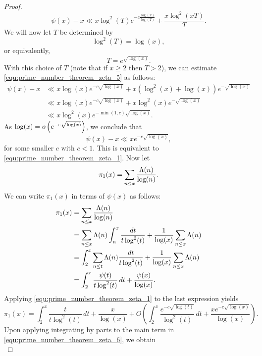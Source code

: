 \begin{proof}
      \begin{equation}\label{equ:prime_number_theorem_zeta_5}
        \psi(x)-x \ll x\log^{2}(T)e^{-c\frac{\log(x)}{\log(T)}}+\frac{x\log^{2}(xT)}{T}.
      \end{equation}
      We will now let $T$ be determined by
      \[
        \log^{2}(T) = \log(x),
      \]
      or equivalently,
      \[
        T = e^{\sqrt{\log(x)}}.
      \]
      With this choice of $T$ (note that if $x \ge 2$ then $T > 2$), we can estimate \cref{equ:prime_number_theorem_zeta_5} as follows:
      \begin{align*}
        \psi(x)-x &\ll x\log(x)e^{-c\sqrt{\log(x)}}+x\left(\log^{2}(x)+\log(x)\right)e^{-\sqrt{\log(x)}} \\
        &\ll x\log(x)e^{-c\sqrt{\log(x)}}+x\log^{2}(x)e^{-\sqrt{\log(x)}} \\
        &\ll x\log^{2}(x)e^{-\min(1,c)\sqrt{\log(x)}}.
      \end{align*}
      As $\log(x) = o\left(e^{-\varepsilon\sqrt{\log(x)}}\right)$, we conclude that
      \[
        \psi(x)-x \ll xe^{-c\sqrt{\log(x)}},
      \]
      for some smaller $c$ with $c < 1$. This is equivalent to \cref{equ:prime_number_theorem_zeta_1}. Now let
      \[
        \pi_{1}(x) = \sum_{n \le x}\frac{\Lambda(n)}{\log(n)}.
      \]
      We can write $\pi_{1}(x)$ in terms of $\psi(x)$ as follows:
      \begin{align*}
        \pi_{1}(x) &= \sum_{n \le x}\frac{\Lambda(n)}{\log(n)} \\
        &= \sum_{n \le x}\Lambda(n)\int_{n}^{x}\frac{dt}{t\log^{2}(t)}+\frac{1}{\log(x)}\sum_{n \le x}\Lambda(n) \\
        &= \int_{2}^{x}\sum_{n \le t}\Lambda(n)\frac{dt}{t\log^{2}(t)}+\frac{1}{\log(x)}\sum_{n \le x}\Lambda(n) \\
        &= \int_{2}^{x}\frac{\psi(t)}{t\log^{2}(t)}\,dt+\frac{\psi(x)}{\log(x)}.
      \end{align*}
      Applying \cref{equ:prime_number_theorem_zeta_1} to the last expression yields
      \begin{equation}\label{equ:prime_number_theorem_zeta_6}
        \pi_{1}(x) = \int_{2}^{x}\frac{t}{t\log^{2}(t)}\,dt+\frac{x}{\log(x)}+O\left(\int_{2}^{x}\frac{e^{-c\sqrt{\log(t)}}}{\log^{2}(t)}\,dt+\frac{xe^{-c\sqrt{\log(x)}}}{\log(x)}\right).
      \end{equation}
      Upon applying integrating by parts to the main term in \cref{equ:prime_number_theorem_zeta_6}, we obtain
      \begin{equation}\label{equ:prime_number_theorem_zeta_7}

\end{equation}
\end{proof}
